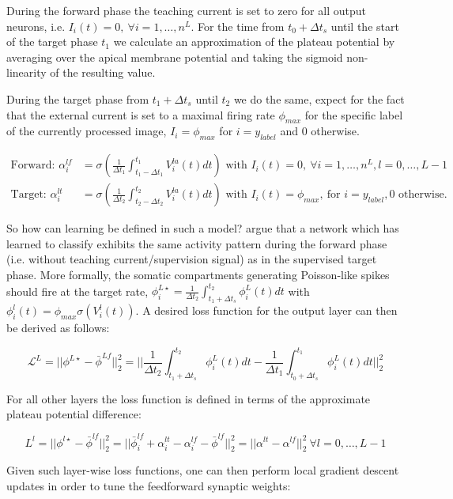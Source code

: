 \documentclass[colorinlistoftodos]{article}
\theoremstyle{definition}
\begin{document}
During the forward phase the teaching current is set to zero for all output neurons, i.e. $I_i(t) = 0, \ \forall i=1,\dots, n^L$. For the time from $t_0 + \Delta t_s$ until the start of the target phase $t_1$ we calculate an approximation of the plateau potential by averaging over the apical membrane potential and taking the sigmoid non-linearity of the resulting value.

During the target phase from $t_1 + \Delta t_s$ until $t_2$ we do the same, expect for the fact that the external current is set to a maximal firing rate $\phi_{max}$ for the specific label of the currently processed image, $I_i = \phi_{max}$ for $i = y_{label}$ and 0 otherwise.
	
\begin{align*}
	\text{Forward:  } \alpha_i^{lf} &= \sigma\left(\frac{1}{\Delta t_1} \int_{t_1 - \Delta t_1}^{t_1} V_i^{la}(t)dt\right) \text{  with  } I_i(t) = 0, \ \forall i=1,\dots, n^L, l=0,\dots, L-1 \\
	\text{Target:  } \alpha_i^{lt} &= \sigma\left(\frac{1}{\Delta t_2} \int_{t_2 - \Delta t_2}^{t_2} V_i^{la}(t)dt\right) \text{  with  } I_i(t) = \phi_{max}, \ \text{for  } i = y_{label}, 0 \text{  otherwise.}
\end{align*}

So how can learning be defined in such a model? \citet{guerguiev2017} argue that a network which has learned to classify exhibits the same activity pattern during the forward phase (i.e. without teaching current/supervision signal) as in the supervised target phase. More formally, the somatic compartments generating Poisson-like spikes should fire at the target rate, $\phi_i^{L\star} = \frac{1}{\Delta t_2} \int_{t_1 + \Delta t_s}^{t_2} \phi_i^L(t)dt$ with $\phi^l_i(t) = \phi_{max} \sigma(V_i^l(t))$. A desired loss function for the output layer can then be derived as follows:

$$\mathcal{L}^L = ||\phi^{L\star} - \bar{\phi}^{Lf}||_2^2 = ||\frac{1}{\Delta t_2} \int_{t_1 + \Delta t_s}^{t_2} \phi_i^L(t)dt - \frac{1}{\Delta t_1} \int_{t_0 + \Delta t_s}^{t_1} \phi_i^L(t)dt||_2^2$$

For all other layers the loss function is defined in terms of the approximate plateau potential difference:

$$L^l = ||\phi^{l\star} - \bar{\phi}^{lf}||_2^2 = ||\bar{\phi}_i^{lf} + \alpha_i^{lt} - \alpha_i^{lf} - \bar{\phi}^{lf}||_2^2 = ||\alpha^{lt} - \alpha^{lf}||_2^2 \ \forall l=0, \dots, L-1$$

Given such layer-wise loss functions, one can then perform local gradient descent updates in order to tune the feedforward synaptic weights:
\end{document}
